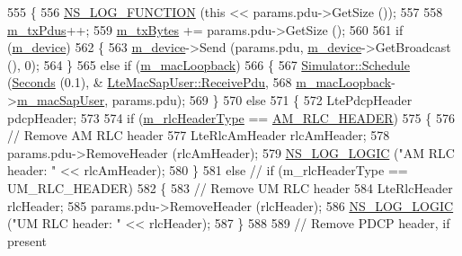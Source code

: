 \begin{DoxyCode}
555 \{
556   \hyperlink{log-macros-disabled_8h_a90b90d5bad1f39cb1b64923ea94c0761}{NS\_LOG\_FUNCTION} (\textcolor{keyword}{this} << params.pdu->GetSize ());
557 
558   \hyperlink{classns3_1_1LteTestMac_af389dc31bf05509d27a8314b3dd6b1e1}{m\_txPdus}++;
559   \hyperlink{classns3_1_1LteTestMac_afb58baaba2fc9d6108db176c23a0ddfb}{m\_txBytes} += params.pdu->GetSize ();
560 
561   \textcolor{keywordflow}{if} (\hyperlink{classns3_1_1LteTestMac_afec9c26af6d1ac8a9c3d7bf0597425c4}{m\_device})
562     \{
563       \hyperlink{classns3_1_1LteTestMac_afec9c26af6d1ac8a9c3d7bf0597425c4}{m\_device}->Send (params.pdu, \hyperlink{classns3_1_1LteTestMac_afec9c26af6d1ac8a9c3d7bf0597425c4}{m\_device}->GetBroadcast (), 0);
564     \}
565   \textcolor{keywordflow}{else} \textcolor{keywordflow}{if} (\hyperlink{classns3_1_1LteTestMac_afaba9cd99a3ceaf0bf2a001cbc9138f0}{m\_macLoopback})
566     \{
567       \hyperlink{classns3_1_1Simulator_a671882c894a08af4a5e91181bf1eec13}{Simulator::Schedule} (\hyperlink{group__timecivil_ga33c34b816f8ff6628e33d5c8e9713b9e}{Seconds} (0.1), &
      \hyperlink{classns3_1_1LteMacSapUser_a5e2dde528876b8b095e94f98f606121e}{LteMacSapUser::ReceivePdu},
568                            \hyperlink{classns3_1_1LteTestMac_afaba9cd99a3ceaf0bf2a001cbc9138f0}{m\_macLoopback}->\hyperlink{classns3_1_1LteTestMac_ab7d2f5362a3e07bc7694286b0fe5debd}{m\_macSapUser}, params.pdu);
569     \}
570   \textcolor{keywordflow}{else}
571     \{
572       LtePdcpHeader pdcpHeader;
573 
574       \textcolor{keywordflow}{if} (\hyperlink{classns3_1_1LteTestMac_acc5726d7fcaab0028ea9fc864468cd9f}{m\_rlcHeaderType} == \hyperlink{classns3_1_1LteTestMac_a1c36ca1572b67fb9614b15fcda18059fa4f8971aa9c5f29c9d7634a06c4270016}{AM\_RLC\_HEADER})
575         \{
576           \textcolor{comment}{// Remove AM RLC header}
577           LteRlcAmHeader rlcAmHeader;
578           params.pdu->RemoveHeader (rlcAmHeader);
579           \hyperlink{group__logging_ga88acd260151caf2db9c0fc84997f45ce}{NS\_LOG\_LOGIC} (\textcolor{stringliteral}{"AM RLC header: "} << rlcAmHeader);
580         \}
581       \textcolor{keywordflow}{else} \textcolor{comment}{// if (m\_rlcHeaderType == UM\_RLC\_HEADER)}
582         \{
583           \textcolor{comment}{// Remove UM RLC header}
584           LteRlcHeader rlcHeader;
585           params.pdu->RemoveHeader (rlcHeader);
586           \hyperlink{group__logging_ga88acd260151caf2db9c0fc84997f45ce}{NS\_LOG\_LOGIC} (\textcolor{stringliteral}{"UM RLC header: "} << rlcHeader);
587         \}
588 
589       \textcolor{comment}{// Remove PDCP header, if present}

\end{DoxyCode}

